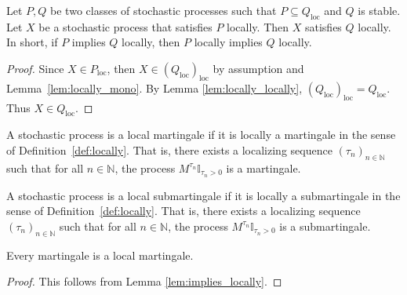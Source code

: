 \begin{lemma}\label{lem:local_induction}
  \leanok
Let $P, Q$ be two classes of stochastic processes such that $P \subseteq Q_{\mathrm{loc}}$ and $Q$ is stable.
Let $X$ be a stochastic process that satisfies $P$ locally.
Then $X$ satisfies $Q$ locally.
In short, if $P$ implies $Q$ locally, then $P$ locally implies $Q$ locally.
\end{lemma}

\begin{proof}
Since $X \in P_{\mathrm{loc}}$, then $X \in (Q_{\mathrm{loc}})_{\mathrm{loc}}$ by assumption and Lemma~\ref{lem:locally_mono}.
By Lemma \ref{lem:locally_locally}, $(Q_{\mathrm{loc}})_{\mathrm{loc}} = Q_{\mathrm{loc}}$.
Thus $X \in Q_{\mathrm{loc}}$.
\end{proof}


\begin{definition}\label{def:IsLocalMartingale}
  \leanok
A stochastic process is a local martingale if it is locally a martingale in the sense of Definition~\ref{def:locally}.
That is, there exists a localizing sequence $(\tau_n)_{n \in \mathbb{N}}$ such that for all $n \in \mathbb{N}$, the process $M^{\tau_n}\mathbb{I}_{\tau_n > 0}$ is a martingale.
\end{definition}


\begin{definition}\label{def:IsLocalSubmartingale}
  \leanok
A stochastic process is a local submartingale if it is locally a submartingale in the sense of Definition~\ref{def:locally}.
That is, there exists a localizing sequence $(\tau_n)_{n \in \mathbb{N}}$ such that for all $n \in \mathbb{N}$, the process $M^{\tau_n}\mathbb{I}_{\tau_n > 0}$ is a submartingale.
\end{definition}


\begin{lemma}\label{lem:Martingale.IsLocalMartingale}
  \leanok
Every martingale is a local martingale.
\end{lemma}

\begin{proof}\leanok
This follows from Lemma \ref{lem:implies_locally}.
\end{proof}


